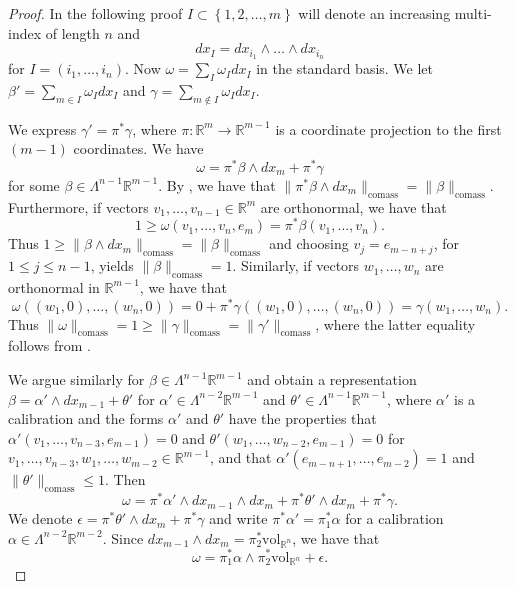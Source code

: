 \documentclass[a4paper,leqno,11pt]{amsart}
\numberwithin{equation}{section}
\theoremstyle{remark}
\theoremstyle{remark}
\newcommand{\R}{\mathbb{R}}
\newcommand{\vol}{\mathrm{vol}}
\newcommand{\comass}{\mathrm{comass}}
\begin{document}
\begin{proof}
In the following proof $I \subset \left\{1,2,\dots,m\right\}$ will denote an increasing multi-index of length $n$ and
\begin{equation*}
    dx_{I} = dx_{i_1} \wedge \dots \wedge dx_{i_n}
\end{equation*}
for $I = (i_1, \dots, i_n )$. Now $\omega = \sum_{ I } \omega_I dx_I$ in the standard basis. We let $\beta' = \sum_{ m \in I } \omega_I dx_I$ and $\gamma = \sum_{ m \not\in I } \omega_I dx_I$.

We express $\gamma' = \pi^{*}\gamma$, where $\pi \colon \R^m \to \R^{m-1}$ is a coordinate projection to the first $(m-1)$ coordinates. We have 
\[
\omega = \pi^{*}\beta \wedge dx_m + \pi^{*}\gamma
\]
for some $\beta \in \Lambda^{n-1} \R^{m-1}$. By , we have that $\| \pi^{*}\beta \wedge dx_m \|_{ \comass } = \| \beta \|_{ \comass }$. Furthermore, if vectors $v_1, \dots, v_{n-1} \in \R^m$ are orthonormal, we have that
\begin{equation*}
    1 \geq \omega( v_1, \dots, v_{n}, e_m ) = \pi^{*}\beta( v_1, \dots, v_n ).
\end{equation*}
Thus $1 \geq \| \beta \wedge dx_m \|_{ \comass } = \| \beta \|_{ \comass }$ and choosing $v_j = e_{m-n+j}$, for $1 \leq j \leq n-1$, yields $\| \beta \|_{\comass} = 1$. Similarly, if vectors $w_1, \dots, w_n$ are orthonormal in $\R^{m-1}$, we have that 
\begin{equation*}
    \omega( (w_1,0), \dots, (w_n,0) )
    =
    0
    +
    \pi^{*}\gamma( (w_1,0), \dots, ( w_n,0 ) )
    =
    \gamma( w_1, \dots, w_n ).
\end{equation*}
Thus $\| \omega \|_{ \comass } = 1  \geq \| \gamma \|_{ \comass } = \| \gamma' \|_{ \comass }$, where the latter equality follows from .

We argue similarly for $\beta \in \Lambda^{n-1} \R^{m-1}$ and obtain a representation $\beta = \alpha' \wedge dx_{m-1} + \theta'$ for $\alpha' \in \Lambda^{n-2}\R^{m-1}$ and $\theta' \in \Lambda^{n-1}\R^{m-1}$, where $\alpha'$ is a calibration and the forms $\alpha'$ and $\theta'$ have the properties that $\alpha'(v_1,\ldots, v_{n-3},e_{m-1})=0$ and $\theta'(w_1,\ldots, w_{n-2},e_{m-1})=0$ for $v_1,\ldots, v_{n-3}, w_1,\ldots, w_{m-2}\in \R^{m-1}$, and that $\alpha'( e_{m-n+1}, \dots, e_{m-2} ) = 1$ and $\| \theta' \|_{\comass} \leq 1$. Then
\begin{equation*}
    \omega = \pi^{*}\alpha' \wedge dx_{m-1} \wedge dx_{m} + \pi^{*}\theta' \wedge dx_{m} + \pi^{*}\gamma.
\end{equation*}
We denote $\epsilon = \pi^{*}\theta' \wedge dx_{m} + \pi^{*}\gamma$ and write $\pi^{*}\alpha' = \pi_1^{*}\alpha$ for a calibration $\alpha \in \Lambda^{n-2} \R^{m-2}$. Since $dx_{m-1} \wedge dx_{m} = \pi_{2}^{*}\vol_{\R^n}$, we have that
\[
\omega = \pi_1^*\alpha \wedge \pi_2^*\vol_{\R^n} + \epsilon.
\]


\end{proof}
\end{document}

